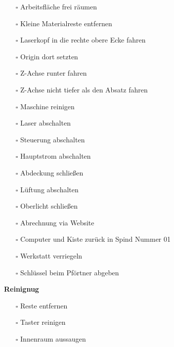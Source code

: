 \documentclass[]{article}
\providecommand{\tightlist}{%
  \setlength{\itemsep}{0pt}\setlength{\parskip}{0pt}}
\begin{document}
\begin{itemize}
\tightlist
\item[$\square$]
  Arbeitsfläche frei räumen\\
\item[$\square$]
  Kleine Materialreste entfernen\\
\item[$\square$]
  Laserkopf in die rechte obere Ecke fahren\\
\item[$\square$]
  Origin dort setzten\\
\item[$\square$]
  Z-Achse runter fahren\\
\item[$\square$]
  Z-Achse nicht tiefer als den Absatz fahren\\
\item[$\square$]
  Maschine reinigen\\
\item[$\square$]
  Laser abschalten\\
\item[$\square$]
  Steuerung abschalten\\
\item[$\square$]
  Hauptstrom abschalten\\
\item[$\square$]
  Abdeckung schließen\\
\item[$\square$]
  Lüftung abschalten\\
\item[$\square$]
  Oberlicht schließen
\item[$\square$]
  Abrechnung via Website
\item[$\square$]
  Computer und Kiste zurück in Spind Nummer 01\\
\item[$\square$]
  Werkstatt verriegeln\\
\item[$\square$]
  Schlüssel beim Pförtner abgeben
\end{itemize}

\textbf{Reinignug}

\begin{itemize}
\tightlist
\item[$\square$]
  Reste entfernen
\item[$\square$]
  Taster reinigen
\item[$\square$]
  Innenraum aussaugen
\end{itemize}
\end{document}
